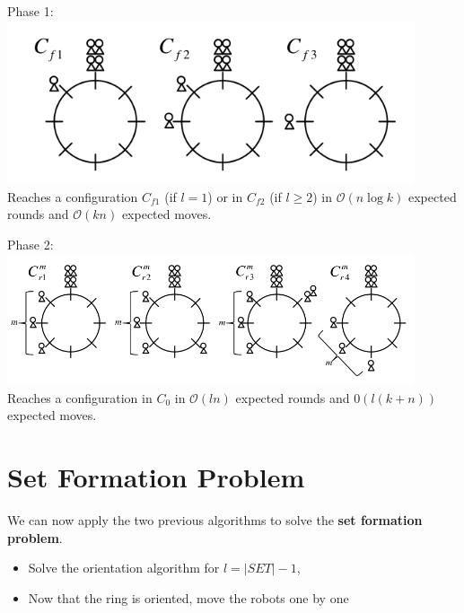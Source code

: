 \documentclass{beamer}
\begin{document}
\begin{frame} 
	Phase 1:
	\includegraphics[width=0.9\textwidth]{images/orient1.png}
	\pause
	Reaches a configuration $C_{f1}$ (if $l = 1$) or in $C_{f2}$ (if $l \geq 2$)
	 in $\mathcal{O}(n \log{k})$ expected rounds and $\mathcal{O}(kn)$ expected moves.
\end{frame}

\begin{frame}
	Phase 2:
	\includegraphics[width=0.9\textwidth]{images/orient2.png}
	\pause
	Reaches a configuration in $C_0$ in $\mathcal{O}(ln)$ expected rounds and $\mathcal{0}(l(k+n))$ expected moves.
\end{frame}

\section{Set Formation Problem}
\begin{frame}
	We can now apply the two previous algorithms to solve the \textbf{set formation problem}.
\end{frame}

\begin{frame}
	\begin{itemize}
		\item<1-> Solve the orientation algorithm for $l = |SET| - 1$,
		\item<2-> Now that the ring is oriented, move the robots one by one
	\end{itemize}
	
\end{frame}
\end{document}
